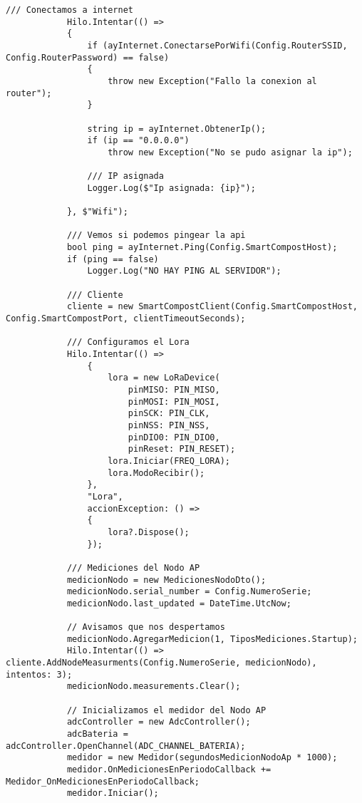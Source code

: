 \begin{lstlisting}[caption={Ejemplo de código en C\#}]
            /// Conectamos a internet
            Hilo.Intentar(() =>
            {
                if (ayInternet.ConectarsePorWifi(Config.RouterSSID, Config.RouterPassword) == false)
                {
                    throw new Exception("Fallo la conexion al router");
                }

                string ip = ayInternet.ObtenerIp();
                if (ip == "0.0.0.0")
                    throw new Exception("No se pudo asignar la ip");

                /// IP asignada
                Logger.Log($"Ip asignada: {ip}");

            }, $"Wifi");

            /// Vemos si podemos pingear la api
            bool ping = ayInternet.Ping(Config.SmartCompostHost);
            if (ping == false)
                Logger.Log("NO HAY PING AL SERVIDOR");

            /// Cliente
            cliente = new SmartCompostClient(Config.SmartCompostHost, Config.SmartCompostPort, clientTimeoutSeconds);

            /// Configuramos el Lora
            Hilo.Intentar(() =>
                {
                    lora = new LoRaDevice(
                        pinMISO: PIN_MISO,
                        pinMOSI: PIN_MOSI,
                        pinSCK: PIN_CLK,
                        pinNSS: PIN_NSS,
                        pinDIO0: PIN_DIO0,
                        pinReset: PIN_RESET);
                    lora.Iniciar(FREQ_LORA);
                    lora.ModoRecibir();
                },
                "Lora",
                accionException: () =>
                {
                    lora?.Dispose();
                });

            /// Mediciones del Nodo AP
            medicionNodo = new MedicionesNodoDto();
            medicionNodo.serial_number = Config.NumeroSerie;
            medicionNodo.last_updated = DateTime.UtcNow;

            // Avisamos que nos despertamos
            medicionNodo.AgregarMedicion(1, TiposMediciones.Startup);
            Hilo.Intentar(() => cliente.AddNodeMeasurments(Config.NumeroSerie, medicionNodo), intentos: 3);
            medicionNodo.measurements.Clear();

            // Inicializamos el medidor del Nodo AP
            adcController = new AdcController();
            adcBateria = adcController.OpenChannel(ADC_CHANNEL_BATERIA);
            medidor = new Medidor(segundosMedicionNodoAp * 1000);
            medidor.OnMedicionesEnPeriodoCallback += Medidor_OnMedicionesEnPeriodoCallback;
            medidor.Iniciar();


\end{lstlisting}
